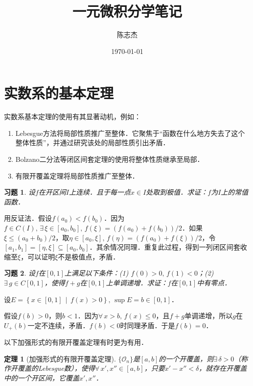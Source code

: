 \documentclass[11pt,a4paper]{ctexart}
\title{一元微积分学笔记}
\author{陈志杰}
\date{\today}
\makeatletter
\theoremstyle{thmseries} %
\newtheorem{thm}{定理}[section]
\theoremstyle{exerseries}
\newtheorem{exer}{习题}[section]
\renewenvironment{proof}[1][\proofname]{\par
  \pushQED{\qed}%
  \normalfont \topsep6\p@\@plus6\p@\relax
  \trivlist
  \item[\hskip\labelsep
        \itshape
    #1\@addpunct{}]\ignorespaces
}{%
  \popQED\endtrivlist\@endpefalse
}
\newenvironment{pf}{\begin{proof}[\bfseries\upshape 证\quad]}{\end{proof}}
\newcommand{\cbra}[1]{\mathopen{}\left\{#1\right\}}
\makeatother
\begin{document}
\maketitle
\thispagestyle{empty}
\tableofcontents
\justifying
\newpage


\section{实数系的基本定理}
实数系基本定理的使用有其显著动机，例如：
\begin{enumerate}
	\item Lebesgue方法将局部性质推广至整体．它聚焦于``函数在什么地方失去了这个整体性质''，并通过研究该处的局部性质引出矛盾．
	\item Bolzano二分法等闭区间套定理的使用将整体性质继承至局部．
	\item 有限开覆盖定理将局部性质推广至整体．
\end{enumerate}

\begin{exer}
	设$f$在开区间$I$上连续．且于每一点$x\in I$处取到极值．求证：$f$为$I$上的常值函数．
\end{exer}
\begin{pf}
	用反证法．假设$f(a_0)<f(b_0)$．因为$f\in C(I),\,\exists\,\xi\in[a_0,b_0],\,f(\xi)=(f(a_0)+f(b_0))/2$．如果$\xi\leq(a_0+b_0)/2$，取$\eta\in[a_0,\xi],\,f(\eta)=(f(a_0)+f(\xi))/2$，令$[a_1,b_1]=[\eta,\xi]\subseteq[a_0,b_0]$．其余情况同理．重复此过程，得到一列闭区间套收缩至$\xi$，可以证明$\xi$不是极值点，矛盾．
\end{pf}

\begin{exer}
	设$f$在$[0,1]$上满足以下条件：(1) $f(0)>0,\,f(1)<0$；(2) $\exists\,g\in C[0,1]$，使得$f+g$在$[0,1]$上单调递增．求证：$f$在$[0,1]$中有零点．
\end{exer}
\begin{pf}
	设$E=\cbra{x\in[0,1]\,\middle\vert\,f(x)>0},\,\sup E=b\in[0,1]$．
	
	假设$f(b)>0$，则$b<1$．因为$\forall\,x>b,\,f(x)\leq0$，且$f+g$单调递增，所以$g$在$U_+(b)$一定不连续，矛盾．$f(b)<0$时同理矛盾．于是$f(b)=0$．
\end{pf}

以下加强形式的有限开覆盖定理有时更为有用．
\begin{thm}[加强形式的有限开覆盖定理]
	$\{\mathcal{O}_n\}$是$[a,b]$的一个开覆盖，则$\exists\,\delta>0$（称作开覆盖的Lebesgue数），使得$\forall\,x',x''\in[a,b]$，只要$x'-x''<\delta$，就存在开覆盖中的一个开区间，它覆盖$x',x''$．
\end{thm}
\end{document}
